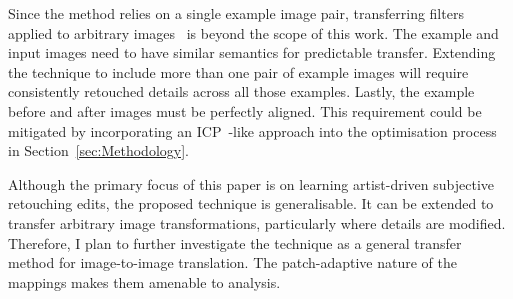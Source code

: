 Since the method relies on a single example image pair, transferring filters applied to arbitrary images~\cite{Yan14Automatic} is beyond the scope of this work. The example and input images need to have similar semantics for predictable transfer. Extending the technique to include more than one pair of example images will require consistently retouched details across all those examples. Lastly, the example before and after images must be perfectly aligned. This requirement could be mitigated by incorporating an ICP~\cite{Besl92AMethod}-like approach into the optimisation process in Section~\ref{sec:Methodology}. 

Although the primary focus of this paper is on learning artist-driven subjective retouching edits, the proposed technique is generalisable. It can be extended to transfer arbitrary image transformations, particularly where details are modified. Therefore, I plan to further investigate the technique as a general transfer method for image-to-image translation. The patch-adaptive nature of the mappings makes them amenable to analysis.